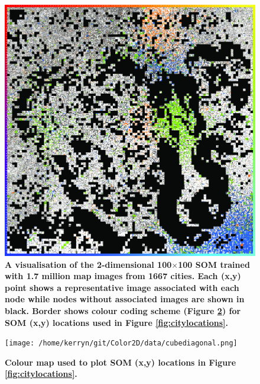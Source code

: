 \begin{figure}
\centering
\includegraphics[trim={0 0 0 0},clip,scale=0.17]{BlockTypologies_Figures2-0.png}
\caption{\bf A visualisation of the 2-dimensional 100$\times$100 SOM trained with 1.7 million map images from 1667 cities. Each (x,y) point shows a representative image associated with each node while nodes without associated images are shown in black. Border shows colour coding scheme (Figure \ref{fig:colormap}) for SOM (x,y) locations used in Figure \ref{fig:citylocations}.}
 \label{fig:somresults}
\end{figure} 

\begin{figure}
\centering
\texttt{[image: /home/kerryn/git/Color2D/data/cubediagonal.png]}
\caption{\bf Colour map used to plot SOM (x,y) locations in Figure \ref{fig:citylocations}. }
 \label{fig:colormap}
\end{figure} 

